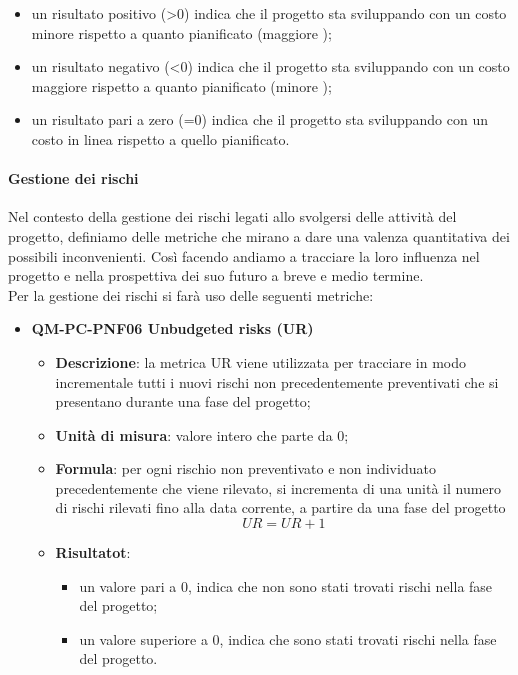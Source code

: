 \begin{itemize}
\begin{itemize}
\begin{itemize}
                                    \item un risultato positivo (>0) indica che il progetto sta sviluppando con un costo minore rispetto a quanto pianificato (maggiore );
                                    \item un risultato negativo (<0) indica che il progetto sta sviluppando con un costo maggiore rispetto a quanto pianificato (minore );
                                    \item un risultato pari a zero (=0) indica che il progetto sta sviluppando con un costo in linea rispetto a quello pianificato.
                                \end{itemize}
                        \end{itemize}
                \end{itemize}
            \paragraph{Gestione dei rischi}
                Nel contesto della gestione dei rischi legati allo svolgersi delle attività del progetto, definiamo delle metriche che mirano a dare una valenza quantitativa dei possibili inconvenienti. Così facendo andiamo a tracciare la loro influenza nel progetto e nella prospettiva dei suo futuro a breve e medio termine.\\
                Per la gestione dei rischi si farà uso delle seguenti metriche:
                \begin{itemize}
                    \item\textbf{QM-PC-PNF06 Unbudgeted risks (UR)}
                        \begin{itemize}
                            \item\textbf{Descrizione}: la metrica UR viene utilizzata per tracciare in modo incrementale tutti i nuovi rischi non precedentemente preventivati che si presentano durante una fase del progetto;
                            \item\textbf{Unità di misura}: valore intero che parte da 0;
                            \item\textbf{Formula}: per ogni rischio non preventivato e non individuato precedentemente che viene rilevato, si incrementa di una unità il numero di rischi rilevati fino alla data corrente, a partire da una fase del progetto
                                \[UR = UR + 1 \]
                            \item\textbf{Risultatot}:
                                \begin{itemize}
                                    \item un valore pari a 0, indica che non sono stati trovati rischi nella fase del progetto;
                                    \item un valore superiore a 0, indica che sono stati trovati rischi nella fase del progetto.
                                \end{itemize}
                        \end{itemize}
                \end{itemize}

